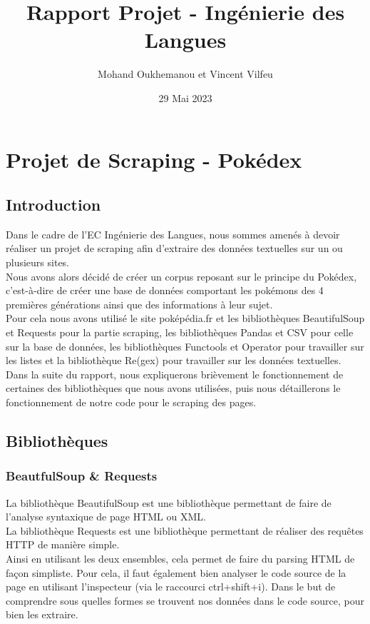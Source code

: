 \documentclass[a4paper, titlepage]{report}
\title{Rapport Projet - Ingénierie des Langues}
\author{Mohand Oukhemanou et Vincent Vilfeu}
\date{29 Mai 2023}
\begin{document}
\maketitle
\chapter*{Projet de Scraping - Pokédex}
\section*{Introduction}

\textnormal{Dans le cadre de l’EC Ingénierie des Langues, nous sommes amenés à devoir réaliser un projet de scraping afin d'extraire des données textuelles sur un ou plusieurs sites.\\
Nous avons alors décidé de créer un corpus reposant sur le principe du Pokédex, c'est-à-dire de créer une base de données comportant les pokémons des 4 premières générations ainsi que des informations à leur sujet.\\
Pour cela nous avons utilisé le site poképédia.fr et les bibliothèques BeautifulSoup et Requests pour la partie scraping, les bibliothèques Pandas et CSV pour celle sur la base de données, les bibliothèques Functools et Operator pour travailler sur les listes et la bibliothèque Re(gex) pour travailler sur les données textuelles.\\
Dans la suite du rapport, nous expliquerons brièvement le fonctionnement de certaines des bibliothèques que nous avons utilisées, puis nous détaillerons le fonctionnement de notre code pour le scraping des pages.\\}


\section*{Bibliothèques}

\subsection*{BeautfulSoup \& Requests}
\textnormal{La bibliothèque BeautifulSoup est une bibliothèque permettant de faire de l'analyse syntaxique de page HTML ou XML.\\
La bibliothèque Requests est une bibliothèque permettant de réaliser des requêtes HTTP de manière simple.\\
Ainsi en utilisant les deux ensembles, cela permet de faire du parsing HTML de façon simpliste. Pour cela, il faut également bien analyser le code source de la page en utilisant l'inspecteur (via le raccourci ctrl+shift+i). Dans le but de comprendre sous quelles formes se trouvent nos données dans le code source, pour bien les extraire.}
\end{document}
